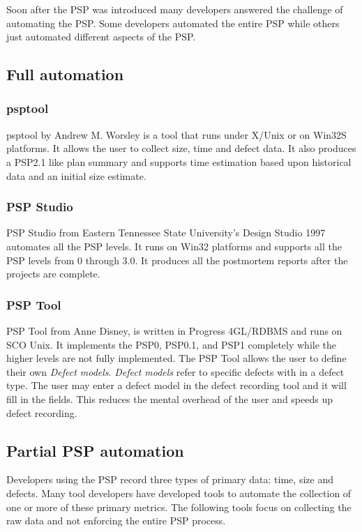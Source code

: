 Soon after the PSP was introduced many developers answered the challenge of
automating the PSP.  Some developers automated the entire PSP while others just 
automated different aspects of the PSP.

\subsection{Full automation}

\subsubsection{psptool}
psptool by Andrew M. Worsley\cite{psptool99} is a tool that runs under
X/Unix or on Win32S platforms. It allows the user to collect size, time and
defect data.  It also produces a PSP2.1 like plan summary and supports time
estimation based upon historical data and an initial size estimate.

\subsubsection{PSP Studio}
PSP Studio from Eastern Tennessee State University's Design Studio
1997\cite{Henry97} automates all the PSP levels.  It runs on Win32 platforms
and supports all the PSP levels from 0 through 3.0.  It produces all the
postmortem reports after the projects are complete.

\subsubsection{PSP Tool}
PSP Tool\cite{Disney98} from Anne Disney, is written in Progress
4GL/RDBMS and runs on SCO Unix.  It implements the PSP0, PSP0.1, and PSP1
completely while the higher levels are not fully implemented.  The PSP Tool
allows the user to define their own {\em Defect models}. {\em Defect models}
refer to specific defects with in a defect type.  The user may enter a defect
model in the defect recording tool and it will fill in the fields.  This
reduces the mental overhead of the user and speeds up defect recording.

\subsection{Partial PSP automation}

Developers using the PSP record three types of primary data: time, size and
defects.  Many tool developers have developed tools to automate the collection
of one or more of these primary metrics.  The following tools focus on
collecting the raw data and not enforcing the entire PSP process.

